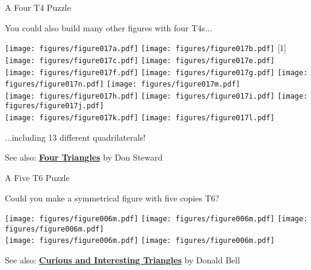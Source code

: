 \documentclass[14pt]{beamer}
\begin{document}
    \begin{frame}{A Four T4 Puzzle}
        \begin{center}
            You could also build many other figures with four T4s...
    
            \bigskip
    
            \texttt{[image: figures/figure017a.pdf]}\;\quad
            \texttt{[image: figures/figure017b.pdf]}\;\;
            \scalebox{-1}[1]{\texttt{[image: figures/figure017c.pdf]}}\;\quad
            \texttt{[image: figures/figure017e.pdf]}\\[-1ex]
            \texttt{[image: figures/figure017f.pdf]}\;\quad
            \texttt{[image: figures/figure017g.pdf]}\;\quad
            \texttt{[image: figures/figure017n.pdf]}
            \texttt{[image: figures/figure017m.pdf]}\\[2ex]
            \texttt{[image: figures/figure017h.pdf]}\;\quad
            \texttt{[image: figures/figure017i.pdf]}\;\quad
            \texttt{[image: figures/figure017j.pdf]}\\[2ex]
            \texttt{[image: figures/figure017k.pdf]}\;\quad
            \texttt{[image: figures/figure017l.pdf]}\;\quad
    
            \bigskip
    
            ...including 13 different quadrilaterals!\bigskip
    
            {\footnotesize See also: \textbf{\href{donsteward.blogspot.com.es/2012/03/four-triangles.html}{Four Triangles}} by Don Steward}
        \end{center}
    \end{frame}


    \begin{frame}{A Five T6 Puzzle}
        \begin{center}
            Could you make a symmetrical figure with five copies T6?

            \bigskip\bigskip

            \texttt{[image: figures/figure006m.pdf]}\qquad
            \texttt{[image: figures/figure006m.pdf]}\qquad
            \texttt{[image: figures/figure006m.pdf]}\\[3ex]\qquad
            \texttt{[image: figures/figure006m.pdf]}\qquad
            \texttt{[image: figures/figure006m.pdf]}

            \bigskip\medskip

            {\footnotesize See also: \textbf{\href{https://mathsjam.com/assets/talks/2015/DonaldBell-CuriousTriangles.pdf}{Curious and Interesting Triangles}} by Donald Bell}
        \end{center}
    \end{frame}
\end{document}
